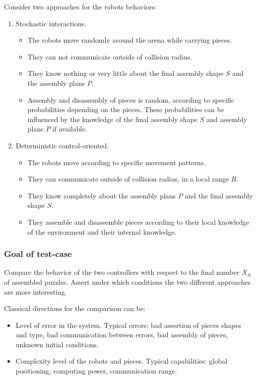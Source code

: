 \documentclass[letterpaper, oneside]{article}
\begin{document}
Consider two approaches for the robots behaviors:
\begin{enumerate}
	\item Stochastic interactions.
	\begin{itemize}
		\item The robots move randomly around the arena while carrying pieces.
		\item They can not communicate outside of collision radius.
		\item They know nothing or very little about the final assembly shape $S$ and the assembly plans $P$.
		\item Assembly and disassembly of pieces is random, according to specific probabilities depending on the pieces. These probabilities can be influenced by the knowledge of the final assembly shape $S$ and assembly plans $P$ if available.
	\end{itemize}
	
	\item Deterministic control-oriented.
	\begin{itemize}
		\item The robots move according to specific movement patterns.
		\item They can communicate outside of collision radius, in a local range $R$.
		\item They know completely about the assembly plans $P$ and the final assembly shape $S$.
		\item They assemble and disassemble pieces according to their local knowledge of the environment and their internal knowledge.
	\end{itemize}
\end{enumerate}

\subsubsection{Goal of test-case} %
\label{ssub:goal_of_test_case}
Compare the behavior of the two controllers with respect to the final number $X_S$ of assembled puzzles.
Assert under which conditions the two different approaches are more interesting.

Classical directions for the comparison can be:
\begin{itemize}
	\item Level of error in the system. Typical errors: bad assertion of pieces shapes and type, bad communication between errors, bad assembly of pieces, unknown initial conditions.
	\item Complexity level of the robots and pieces. Typical capabilities: global positioning, computing power, communication range.
\end{itemize}
\end{document}
